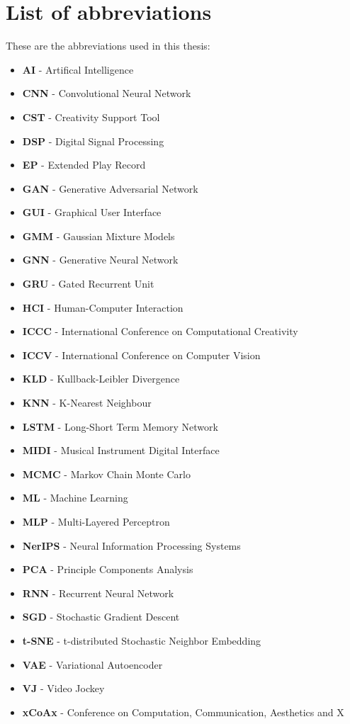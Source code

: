 \chapter*{List of abbreviations}

These are the abbreviations used in this thesis: 
\begin{itemize}
\item \textbf{AI} - Artifical Intelligence
\item \textbf{CNN} - Convolutional Neural Network
\item \textbf{CST} - Creativity Support Tool
\item \textbf{DSP} - Digital Signal Processing
\item \textbf{EP} - Extended Play Record
\item \textbf{GAN} - Generative Adversarial Network
\item \textbf{GUI} - Graphical User Interface
\item \textbf{GMM} - Gaussian Mixture Models
\item \textbf{GNN} - Generative Neural Network
\item \textbf{GRU} - Gated Recurrent Unit
\item \textbf{HCI} - Human-Computer Interaction
\item \textbf{ICCC} - International Conference on Computational Creativity
\item \textbf{ICCV} - International Conference on Computer Vision
\item \textbf{KLD} - Kullback-Leibler Divergence
\item \textbf{KNN} - K-Nearest Neighbour
\item \textbf{LSTM} - Long-Short Term Memory Network
\item \textbf{MIDI} - Musical Instrument Digital Interface
\item \textbf{MCMC} - Markov Chain Monte Carlo
\item \textbf{ML} - Machine Learning
\item \textbf{MLP} - Multi-Layered Perceptron
\item \textbf{NerIPS} - Neural Information Processing Systems
\item \textbf{PCA} - Principle Components Analysis
\item \textbf{RNN} - Recurrent Neural Network
\item \textbf{SGD} - Stochastic Gradient Descent
\item \textbf{t-SNE} - t-distributed Stochastic Neighbor Embedding
\item \textbf{VAE} - Variational Autoencoder
\item \textbf{VJ} - Video Jockey
\item \textbf{xCoAx} - Conference on Computation, Communication, Aesthetics and X
\end{itemize}